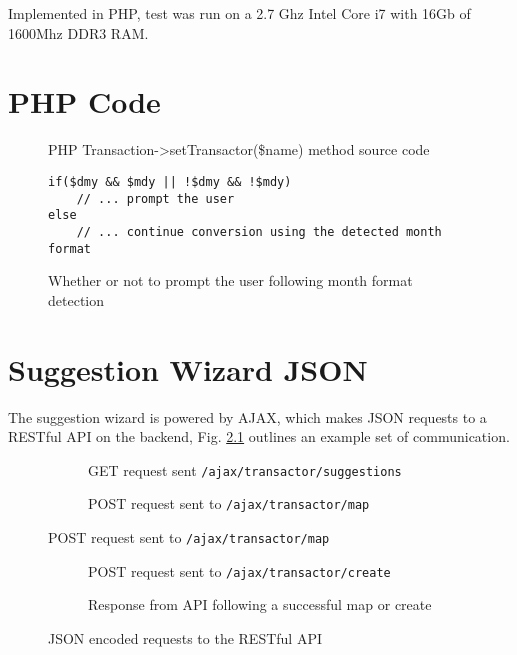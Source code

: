 \begin{appendices}
Implemented in PHP, test was run on a 2.7 Ghz Intel Core i7 with 16Gb of 1600Mhz DDR3 RAM.



\chapter{PHP Code} 

\begin{figure}

\label{fig:settransactor}
\caption{PHP Transaction->setTransactor(\$name) method source code}
\end{figure}

\begin{figure}
\lstset{style=phpcolor}
\begin{lstlisting}
if($dmy && $mdy || !$dmy && !$mdy)
    // ... prompt the user
else
    // ... continue conversion using the detected month format
\end{lstlisting}
\caption{Whether or not to prompt the user following month format detection}
\end{figure}
\chapter{Suggestion Wizard JSON}

The suggestion wizard is powered by AJAX, which makes JSON requests to a RESTful API on the backend, Fig. \ref{fig:json-examples} outlines an example set of communication.

\begin{figure}
    \begin{subfigure}[a]{\textwidth}
        
        \caption{GET request sent \lstinline{/ajax/transactor/suggestions}}
    \end{subfigure}
    
    \begin{subfigure}[b]{\textwidth}
        
        \caption{POST request sent to \lstinline{/ajax/transactor/map}}
    \end{subfigure}
\end{figure}

\begin{figure}
    \ContinuedFloat   
    \begin{subfigure}[c]{\textwidth}
        
        \caption{POST request sent to \lstinline{/ajax/transactor/create}}
    \end{subfigure}
    
    \begin{subfigure}[d]{\textwidth}
        
        \caption{Response from API following a successful map or create}
    \end{subfigure}    

    \caption{JSON encoded requests to the RESTful API}
    \label{fig:json-examples}
\end{figure}

\end{appendices}
